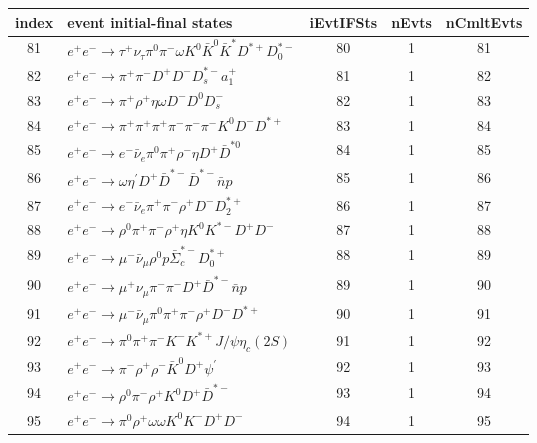 \documentclass[landscape]{article}
\begin{document}
\begin{table}[htbp!]
\small
\centering
\begin{tabular}{|c|>{\centering}p{18cm}|c|c|c|}
\hline
index & event initial-final states & iEvtIFSts & nEvts & nCmltEvts \\
\hline
81 & $ e^{+} e^{-} \rightarrow \tau^{+} \nu_{\tau} \pi^{0} \pi^{-} \omega K^{0} \bar{K}^{0} \bar{K}^{*} D^{*+} D_{0}^{*-} $ & 80 & 1 & 81 \\
\hline
82 & $ e^{+} e^{-} \rightarrow \pi^{+} \pi^{-} D^{+} D^{-} D_{s}^{*-} a_{1}^{+} $ & 81 & 1 & 82 \\
\hline
83 & $ e^{+} e^{-} \rightarrow \pi^{+} \rho^{+} \eta \omega D^{-} D^{0} D_{s}^{-} $ & 82 & 1 & 83 \\
\hline
84 & $ e^{+} e^{-} \rightarrow \pi^{+} \pi^{+} \pi^{+} \pi^{-} \pi^{-} \pi^{-} K^{0} D^{-} D^{*+} $ & 83 & 1 & 84 \\
\hline
85 & $ e^{+} e^{-} \rightarrow e^{-} \bar{\nu}_{e} \pi^{0} \pi^{+} \rho^{-} \eta D^{+} \bar{D}^{*0} $ & 84 & 1 & 85 \\
\hline
86 & $ e^{+} e^{-} \rightarrow \omega \eta^{\prime} D^{+} \bar{D}^{*-} \bar{D}^{*-} \bar{n} p $ & 85 & 1 & 86 \\
\hline
87 & $ e^{+} e^{-} \rightarrow e^{-} \bar{\nu}_{e} \pi^{+} \pi^{-} \rho^{+} D^{-} D_{2}^{*+} $ & 86 & 1 & 87 \\
\hline
88 & $ e^{+} e^{-} \rightarrow \rho^{0} \pi^{+} \pi^{-} \rho^{+} \eta K^{0} K^{*-} D^{+} D^{-} $ & 87 & 1 & 88 \\
\hline
89 & $ e^{+} e^{-} \rightarrow \mu^{-} \bar{\nu}_{\mu} \rho^{0} p \bar{\Sigma}_{c}^{*-} D_{0}^{*+} $ & 88 & 1 & 89 \\
\hline
90 & $ e^{+} e^{-} \rightarrow \mu^{+} \nu_{\mu} \pi^{-} \pi^{-} D^{+} \bar{D}^{*-} \bar{n} p $ & 89 & 1 & 90 \\
\hline
91 & $ e^{+} e^{-} \rightarrow \mu^{-} \bar{\nu}_{\mu} \pi^{0} \pi^{+} \pi^{-} \rho^{+} D^{-} D^{*+} $ & 90 & 1 & 91 \\
\hline
92 & $ e^{+} e^{-} \rightarrow \pi^{0} \pi^{+} \pi^{-} K^{-} K^{*+} J/\psi \eta_{c}(2S) $ & 91 & 1 & 92 \\
\hline
93 & $ e^{+} e^{-} \rightarrow \pi^{-} \rho^{+} \rho^{-} \bar{K}^{0} D^{+} \psi^{\prime} $ & 92 & 1 & 93 \\
\hline
94 & $ e^{+} e^{-} \rightarrow \rho^{0} \pi^{-} \rho^{+} K^{0} D^{+} \bar{D}^{*-} $ & 93 & 1 & 94 \\
\hline
95 & $ e^{+} e^{-} \rightarrow \pi^{0} \rho^{+} \omega \omega K^{0} K^{-} D^{+} D^{-} $ & 94 & 1 & 95 \\

\end{tabular}
\end{table}
\end{document}

